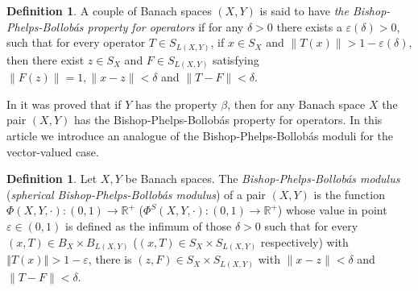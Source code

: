 \documentclass[11pt,a4paper]{amsart}
\newcommand{\R}{{\mathbb{R}}}
\newcommand{\eps}{\varepsilon}
\newcommand{\norm}[1]{\left\Vert#1\right\Vert}
\numberwithin{equation}{section}
\theoremstyle{plain}
\theoremstyle{definition}
\newtheorem{definition}[theorem]{Definition}
\begin{document}
\begin{definition} \label{defBPBproperty} A couple of Banach spaces $(X,Y)$ is said to have \emph{the Bishop-Phelps-Bollob\'{a}s property for operators} if for any 
$\delta>0$
there exists a $\eps(\delta)>0$, such that for every operator $T\in S_{L(X,Y)}$, 
if $x\in S_X$ and
$\|T(x)\|>1-\eps(\delta)$, then there exist $z\in S_X$ and
$F\in S_{L(X,Y)}$ satisfying  $\|F(z)\|=1, \|x-z\|<\delta$  and $\|T-F\|<\delta$.
\end{definition}

In \cite[Theorem 2.2]{Acosta2008} it was proved that if $Y$ has the property $\beta$, then for any Banach space $X$ the pair $(X, Y)$ has the Bishop-Phelps-Bollob\'{a}s property for operators. In this article we introduce an analogue of the Bishop-Phelps-Bollob\'{a}s moduli for the vector-valued case.


\begin{definition}\label{def-bpb-mod-op}
Let $X, Y$ be Banach spaces. The \emph{Bishop-Phelps-Bollob\'{a}s modulus} (\emph{spherical Bishop-Phelps-Bollob\'{a}s modulus}) of a pair $(X, Y)$ is the function $\Phi(X,Y,\cdot):(0,1)\longrightarrow \R^+$ ($\Phi^S(X,Y,\cdot):(0,1)\longrightarrow \R^+$) whose value in point $\eps\in (0,1)$ is defined as the infimum of those $\delta>0$ such that for every $(x,T)\in B_X\times B_{L(X,Y)}$ ($(x,T)\in S_X\times S_{L(X,Y)}$ respectively) with $ \norm{T(x)}>1-\eps$, there is $(z,F)\in S_X\times S_{L(X,Y)}$ with $\|x-z\|<\delta$ and $\|T-F\|<\delta$.
\end{definition}
\end{document}
